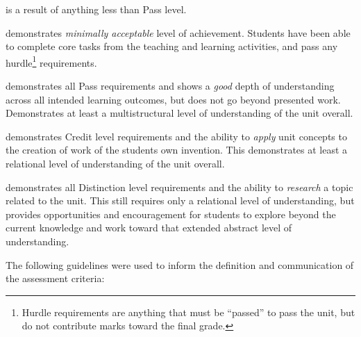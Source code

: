 \begin{description}
	\item[Fail] is a result of anything less than Pass level.
	\item[Pass] demonstrates \emph{minimally acceptable} level of achievement. Students have been able to complete core tasks from the teaching and learning activities, and pass any hurdle\footnote{Hurdle requirements are anything that must be ``passed'' to pass the unit, but do not contribute marks toward the final grade.} requirements.
	\item[Credit] demonstrates all Pass requirements and shows a \emph{good} depth of understanding across all intended learning outcomes, but does not go beyond presented work. Demonstrates at least a multistructural level of understanding of the unit overall.
	\item[Distinction] demonstrates Credit level requirements and the ability to \emph{apply} unit concepts to the creation of work of the students own invention. This demonstrates at least a relational level of understanding of the unit overall.
	\item[High Distinction] demonstrates all Distinction level requirements and the ability to \emph{research} a topic related to the unit. This still requires only a relational level of understanding, but provides opportunities and encouragement for students to explore beyond the current knowledge and work toward that extended abstract level of understanding.
\end{description}

\clearpage 

The following guidelines were used to inform the definition and communication of the assessment criteria:
%
% 

